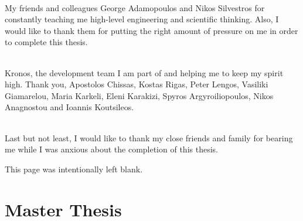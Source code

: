 \documentclass{article}
\begin{document}
\paragraph{} My friends and colleagues George Adamopoulos and Nikos Silvestros for constantly teaching me high-level engineering and scientific thinking. Also, I would like to thank them for putting the right amount of pressure on me in order to complete this thesis.

\paragraph{} Kronos, the development team I am part of and helping me to keep my spirit high. Thank you, Apostolos Chissas, Kostas Rigas, Peter Lengos, Vasiliki Giamarelou, Maria Karkeli, Eleni Karakizi, Spyros Argyroiliopoulos, Nikos Anagnostou and Ioannis Koutsileos. 

\paragraph{} Last but not least, I would like to thank my close friends and family for bearing me while I was anxious about the completion of this thesis.

\newpage
\begin{center}
This page was intentionally left blank.
\end{center}

\newpage
{}
\part{Master Thesis}





\newpage



\end{document}
